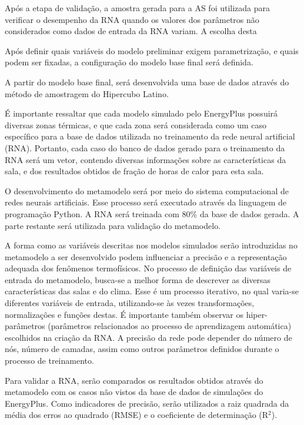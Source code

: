 \documentclass[brazil,hardcopy,openany,a5paper]{ufscthesis}
\begin{document}
		Após a etapa de validação, a amostra gerada para a AS foi utilizada para verificar o desempenho da RNA quando os valores dos parâmetros não considerados como dados de entrada da RNA variam. A escolha desta 
		
		Após definir quais variáveis do modelo preliminar exigem parametrização, e quais podem ser fixadas, a configuração do modelo base final será definida.
		
		A partir do modelo base final, será desenvolvida uma base de dados através do método de amostragem do Hipercubo Latino.
		
		É importante ressaltar que cada modelo simulado pelo EnergyPlus possuirá diversas zonas térmicas, e que cada zona será considerada como um caso específico para a base de dados utilizada no treinamento da rede neural artificial (RNA). Portanto, cada caso do banco de dados gerado para o treinamento da RNA será um vetor, contendo diversas informações sobre as características da sala, e dos resultados obtidos de fração de horas de calor para esta sala.
		
		O desenvolvimento do metamodelo será por meio do sistema computacional de redes neurais artificiais. Esse processo será executado através da linguagem de programação Python. A RNA será treinada com 80\% da base de dados gerada. A parte restante será utilizada para validação do metamodelo.
		
		A forma como as variáveis descritas nos modelos simulados serão introduzidas no metamodelo a ser desenvolvido podem influenciar a precisão e a representação adequada dos fenômenos termofísicos. No processo de definição das variáveis de entrada do metamodelo, busca-se a melhor forma de descrever as diversas características das salas e do clima. Esse é um processo iterativo, no qual varia-se diferentes variáveis de entrada, utilizando-se às vezes transformações, normalizações e funções destas. É importante também observar os hiper-parâmetros (parâmetros relacionados ao processo de aprendizagem automática) escolhidos na criação da RNA. A precisão da rede pode depender do número de nós, número de camadas, assim como outros parâmetros definidos durante o processo de treinamento.
		
		Para validar a RNA, serão comparados os resultados obtidos através do metamodelo com os casos não vistos da base de dados de simulações do EnergyPlus. Como indicadores de precisão, serão utilizados a raiz quadrada da média dos erros ao quadrado (RMSE) e o coeficiente de determinação (R$^2$).
		

%
%

	
\end{document}
